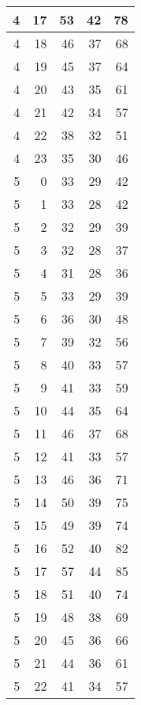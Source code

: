 \begin{longtable}{|r|r|r|r|r|}
    4     & 17    & 53    & 42    & 78 \\\hline
    4     & 18    & 46    & 37    & 68 \\\hline
    4     & 19    & 45    & 37    & 64 \\\hline
    4     & 20    & 43    & 35    & 61 \\\hline
    4     & 21    & 42    & 34    & 57 \\\hline
    4     & 22    & 38    & 32    & 51 \\\hline
    4     & 23    & 35    & 30    & 46 \\\hline
    5     & 0     & 33    & 29    & 42 \\\hline
    5     & 1     & 33    & 28    & 42 \\\hline
    5     & 2     & 32    & 29    & 39 \\\hline
    5     & 3     & 32    & 28    & 37 \\\hline
    5     & 4     & 31    & 28    & 36 \\\hline
    5     & 5     & 33    & 29    & 39 \\\hline
    5     & 6     & 36    & 30    & 48 \\\hline
    5     & 7     & 39    & 32    & 56 \\\hline
    5     & 8     & 40    & 33    & 57 \\\hline
    5     & 9     & 41    & 33    & 59 \\\hline
    5     & 10    & 44    & 35    & 64 \\\hline
    5     & 11    & 46    & 37    & 68 \\\hline
    5     & 12    & 41    & 33    & 57 \\\hline
    5     & 13    & 46    & 36    & 71 \\\hline
    5     & 14    & 50    & 39    & 75 \\\hline
    5     & 15    & 49    & 39    & 74 \\\hline
    5     & 16    & 52    & 40    & 82 \\\hline
    5     & 17    & 57    & 44    & 85 \\\hline
    5     & 18    & 51    & 40    & 74 \\\hline
    5     & 19    & 48    & 38    & 69 \\\hline
    5     & 20    & 45    & 36    & 66 \\\hline
    5     & 21    & 44    & 36    & 61 \\\hline
    5     & 22    & 41    & 34    & 57 \\\hline

\end{longtable}
